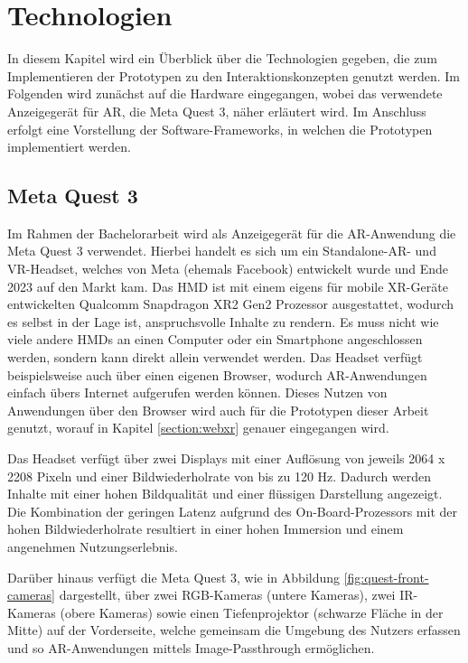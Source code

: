\chapter{Technologien} %

In diesem Kapitel wird ein Überblick über die Technologien gegeben, die zum Implementieren der Prototypen zu den Interaktionskonzepten genutzt werden.
Im Folgenden wird zunächst auf die Hardware eingegangen, wobei das verwendete Anzeigegerät für AR, die Meta Quest 3, näher erläutert wird.
Im Anschluss erfolgt eine Vorstellung der Software-Frameworks, in welchen die Prototypen implementiert werden.

\section{Meta Quest 3}

Im Rahmen der Bachelorarbeit wird als Anzeigegerät für die AR-Anwendung die Meta Quest 3 verwendet.
Hierbei handelt es sich um ein Standalone-AR- und VR-Headset, welches von Meta (ehemals Facebook) entwickelt wurde und Ende 2023 auf den Markt kam.
Das HMD ist mit einem eigens für mobile XR-Geräte entwickelten Qualcomm Snapdragon XR2 Gen2 Prozessor ausgestattet, wodurch es selbst in der Lage ist, anspruchsvolle Inhalte zu rendern.
Es muss nicht wie viele andere HMDs an einen Computer oder ein Smartphone angeschlossen werden, sondern kann direkt allein verwendet werden.
Das Headset verfügt beispielsweise auch über einen eigenen Browser, wodurch AR-Anwendungen einfach übers Internet aufgerufen werden können.
Dieses Nutzen von Anwendungen über den Browser wird auch für die Prototypen dieser Arbeit genutzt, worauf in Kapitel \ref{section:webxr} genauer eingegangen wird.

Das Headset verfügt über zwei Displays mit einer Auflösung von jeweils 2064 x 2208 Pixeln und einer Bildwiederholrate von bis zu 120 Hz.
Dadurch werden Inhalte mit einer hohen Bildqualität und einer flüssigen Darstellung angezeigt.
Die Kombination der geringen Latenz aufgrund des On-Board-Prozessors mit der hohen Bildwiederholrate resultiert in einer hohen Immersion und einem angenehmen Nutzungserlebnis.

\newpage

Darüber hinaus verfügt die Meta Quest 3, wie in Abbildung \ref{fig:quest-front-cameras} dargestellt, über zwei RGB-Kameras (untere Kameras), zwei IR-Kameras (obere Kameras) sowie einen Tiefenprojektor (schwarze Fläche in der Mitte) auf der Vorderseite, welche gemeinsam die Umgebung des Nutzers erfassen und so AR-Anwendungen mittels Image-Passthrough ermöglichen.

